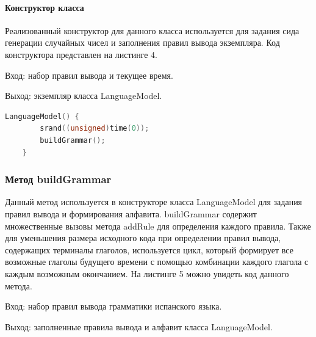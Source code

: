 \documentclass[a4paper,final]{article}
\begin{document}
\paragraph{Конструктор класса}
Реализованный конструктор для данного класса используется для задания сида генерации случайных чисел и заполнения правил вывода экземпляра. Код конструктора представлен на листинге 4.

Вход: набор правил вывода и текущее время.

Выход: экземпляр класса LanguageModel.

\footnotesize{
\begin{lstlisting}[language=C++, caption = {Конструктор класса LanguageModel}]
LanguageModel() {
		srand((unsigned)time(0));
		buildGrammar();
	}
\end{lstlisting}
}
\small


\subsubsection{Метод buildGrammar}
Данный метод используется в конструкторе класса LanguageModel для задания правил вывода и формирования алфавита. buildGrammar содержит множественные вызовы метода addRule для определения каждого правила. Также для уменьшения размера исходного кода при определении правил вывода, содержащих терминалы глаголов, используется цикл, который формирует все возможные глаголы будущего времени с помощью комбинации каждого глагола с каждым возможным окончанием. На листинге 5 можно увидеть код данного метода.

Вход: набор правил вывода грамматики испанского языка.

Выход: заполненные правила вывода и алфавит класса LanguageModel.
\end{document}
